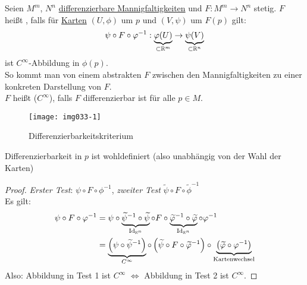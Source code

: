 \begin{definition}[Differenzierbarkeit]
  Seien $ M^m $, $ N^n $ \hyperref[def:dbmannigfaltigkeit]{differenzierbare Mannigfaltigkeiten} und $ F: M^m \to N^n $ stetig. $ F $ heißt \label{def:differenzierbar}, falls für \hyperref[def:karte]{Karten} $ (U, \phi) $ um $ p $ und $ (V, \psi) $ um $ F(p) $ gilt:
  \begin{equation*}
    \psi \circ F \circ \varphi^{-1}: \underbrace{\varphi(U)}_{\subset \mathbb{R}^m} \to \underbrace{\psi(V)}_{\subset \mathbb{R}^n}
  \end{equation*}
  ist $ C^\infty $-Abbildung in $ \phi(p) $. \\
  So kommt man von einem abstrakten $ F $ zwischen den Mannigfaltigkeiten zu einer konkreten Darstellung von $ F $. \\
  $ F $ heißt  ($ C^\infty $), falls $ F $ differenzierbar ist für alle $ p \in M $.
  \begin{figure}[H]
    \label{img033-1}
    \texttt{[image: img033-1]}
    \caption{Differenzierbarkeitskriterium}
  \end{figure}
\end{definition}

\begin{remark}
  Differenzierbarkeit in $ p $ ist wohldefiniert (also unabhängig von der Wahl der Karten)
  \begin{proof}
    \emph{Erster Test}: $ \psi \circ F \circ \phi^{-1} $, \emph{zweiter Test} $ \widetilde{\psi} \circ F \circ \widetilde{\phi}^{-1} $ \\
    Es gilt:
    \begin{align*}
      \psi \circ F \circ \varphi^{-1} &= \psi \circ \underbrace{\widetilde{\psi}^{-1} \circ \widetilde{\psi}}_{\text{Id}_{\mathbb{R}^n}} \circ F \circ \underbrace{\widetilde{\varphi}^{-1} \circ \widetilde{\varphi}}_{\text{Id}_{\mathbb{R}^n}} \circ \varphi^{-1} \\
        &= \underbrace{\left( \psi \circ \widetilde{\psi}^{-1} \right)}_{C^\infty} \circ \left( \widetilde{\psi} \circ F \circ \widetilde{\varphi}^{-1} \right) \circ \underbrace{\left( \widetilde{\varphi} \circ \varphi^{-1} \right)}_{\text{Kartenwechsel}}
    \end{align*}
    Also: Abbildung in Test 1 ist $ C^\infty $ $ \Leftrightarrow $ Abbildung in Test 2 ist $ C^\infty $.
  \end{proof}
\end{remark}

